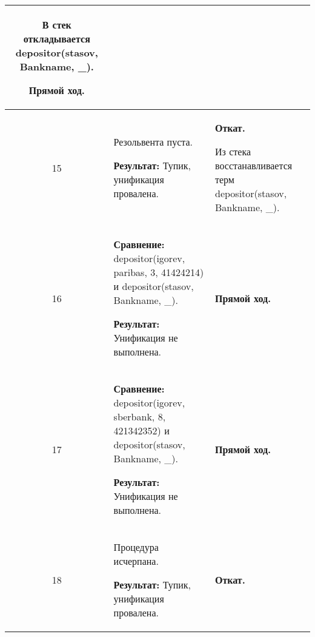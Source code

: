 \begin{longtable}{|c|p{}|p{}|}
    В стек откладывается\newline
    depositor(stasov, Bankname, \_).
    \newline

    \textbf{Прямой ход.}
                       \\ \hline

    15
                       &
    Резольвента пуста.
    \newline

    \textbf{Результат:} \newline
    Тупик, унификация провалена.
                       &
    \textbf{Откат.}
    \newline

    Из стека восстанавливается терм \newline
    depositor(stasov, Bankname, \_).
                       \\ \hline

    16
                       &
\textbf{Сравнение:} \newline
  depositor(igorev, paribas,  3, 41424214)
    \newline и \newline
    depositor(stasov, Bankname, \_).
    \newline

    \textbf{Результат:} \newline
    Унификация не выполнена.
                       &
    \textbf{Прямой ход.}
                       \\ \hline

    17
                       &
\textbf{Сравнение:} \newline
  depositor(igorev, sberbank, 8, 421342352)
    \newline и \newline
    depositor(stasov, Bankname, \_).
    \newline

    \textbf{Результат:} \newline
    Унификация не выполнена.
                       &
    \textbf{Прямой ход.}
                       \\ \hline

    18
                       &
    Процедура исчерпана.
    \newline

    \textbf{Результат:} \newline
    Тупик, унификация провалена.
                       &
    \textbf{Откат.}
    \newline


\end{longtable}
